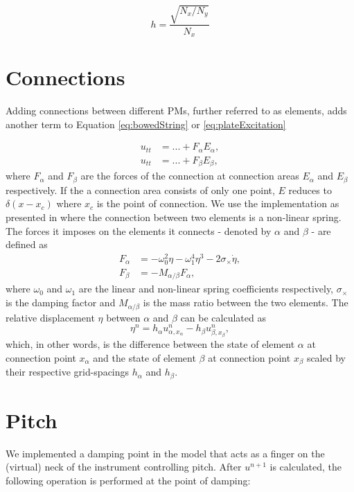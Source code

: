 \documentclass{article}
\begin{document}
\begin{equation}
    h = \frac{\sqrt{N_x / N_y}}{N_x}
\end{equation}

\section{Connections}\label{sec:connections}
Adding connections between different PMs, further referred to as elements, adds another term to Equation \eqref{eq:bowedString} or \eqref{eq:plateExcitation}

\begin{align}
    u_{tt} &= ... + F_\alpha E_\alpha, \\
    u_{tt} &= ... + F_\beta E_\beta,
\end{align}
where $F_\alpha$ and $F_\beta$ are the forces of the connection at connection areas $E_\alpha$ and $E_\beta$ respectively. If the a connection area consists of only one point, $E$ reduces to $\delta(x-x_c)$ where $x_c$ is the point of connection. We use the implementation as presented in \cite{Bilbao2009:ModularPercussion} where the connection between two elements is a non-linear spring. The forces it imposes on the elements it connects - denoted by $\alpha$ and $\beta$ - are defined as
\begin{align}
    F_\alpha &= -\omega_0^2\eta - \omega_1^4\eta^3 - 2\sigma_\times\dot\eta,\\
    F_\beta &= -M_{\alpha/\beta}F_\alpha,
\end{align}
where $\omega_0$ and $\omega_1$ are the linear and non-linear spring coefficients respectively, $\sigma_\times$ is the damping factor and $M_{\alpha/\beta}$ is the mass ratio between the two elements. The relative displacement $\eta$ between $\alpha$ and $\beta$ can be calculated as
\begin{equation}
    \eta^n = h_\alpha u_{\alpha, x_\alpha}^n - h_\beta u_{\beta,x_\beta}^n,
\end{equation}
which, in other words, is the difference between the state of element $\alpha$ at connection point $x_\alpha$ and the state of element $\beta$ at connection point $x_\beta$ scaled by their respective grid-spacings $h_\alpha$ and $h_\beta$.

\section{Pitch}
We implemented a damping point in the model that acts as a finger on the (virtual) neck of the instrument controlling pitch. After $u^{n+1}$ is calculated, the following operation is performed at the point of damping:
\end{document}
